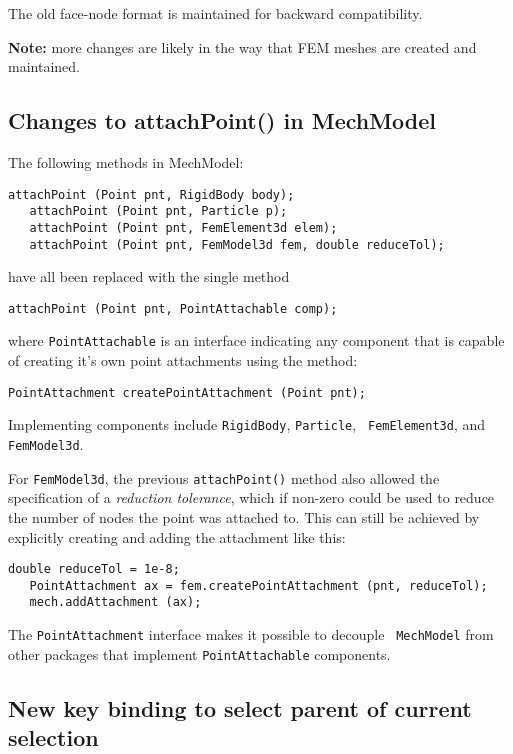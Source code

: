 \documentclass{article}
\begin{document}
The old face-node format is maintained for backward compatibility.

\begin{sideblock}
{\bf Note:} more changes are likely in the way that FEM meshes 
are created and maintained.
\end{sideblock}

\subsection*{Changes to attachPoint() in MechModel}

The following methods in MechModel:
%
\begin{lstlisting}[]
   attachPoint (Point pnt, RigidBody body);
   attachPoint (Point pnt, Particle p);
   attachPoint (Point pnt, FemElement3d elem);
   attachPoint (Point pnt, FemModel3d fem, double reduceTol);
\end{lstlisting}
%
have all been replaced with the single method
\begin{lstlisting}[]
   attachPoint (Point pnt, PointAttachable comp);
\end{lstlisting}
where {\tt PointAttachable} is an interface indicating any component
that is capable of creating it's own point attachments
using the method:
\begin{lstlisting}[]
   PointAttachment createPointAttachment (Point pnt);
\end{lstlisting}
Implementing components include {\tt RigidBody}, {\tt Particle}, {\tt
FemElement3d}, and {\tt FemModel3d}.  

For {\tt FemModel3d}, the previous {\tt attachPoint()} method also
allowed the specification of a {\it reduction tolerance}, which if
non-zero could be used to reduce the number of nodes the point was
attached to. This can still be achieved by explicitly creating and
adding the attachment like this:
%
\begin{lstlisting}[]
   double reduceTol = 1e-8;
   PointAttachment ax = fem.createPointAttachment (pnt, reduceTol);
   mech.addAttachment (ax);
\end{lstlisting}
%

The {\tt PointAttachment} interface makes it possible to decouple {\tt
MechModel} from other packages that implement {\tt PointAttachable}
components. 

\subsection*{New key binding to select parent of current selection}
\end{document}
